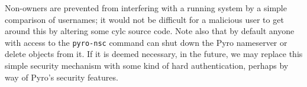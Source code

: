 
Non-owners are prevented from interfering with a running system by a
simple comparison of usernames; it would not be difficult for a
malicious user to get around this by altering some cylc source code.
Note also that by default anyone with access to the \lstinline=pyro-nsc=
command can shut down the Pyro nameserver or delete objects from it. If
it is deemed necessary, in the future, we may replace this simple
security mechanism with some kind of hard authentication, perhaps by way
of Pyro's security features.
